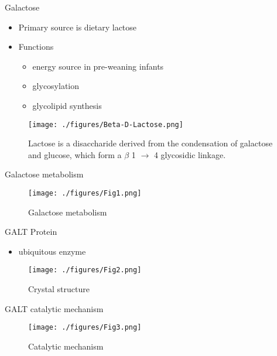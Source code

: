 \documentclass[presentation, smaller]{beamer}
\begin{document}
\begin{frame}[label={sec:orgheadline2}]{Galactose}
\begin{itemize}
\item Primary source is dietary lactose
\item Functions
\begin{itemize}
\item energy source in pre-weaning infants
\item glycosylation
\item glycolipid synthesis
\end{itemize}
\end{itemize}


\begin{figure}[htb]
\centering
\texttt{[image: ./figures/Beta-D-Lactose.png]}
\caption[lactose]{\label{fig:lactose}
Lactose is a disaccharide derived from the condensation of galactose and glucose, which form a \(\beta\) 1 \(\to\) 4 glycosidic linkage.}
\end{figure}
\end{frame}


\begin{frame}[label={sec:orgheadline3}]{Galactose metabolism}
\begin{figure}[htb]
\centering
\texttt{[image: ./figures/Fig1.png]}
\caption[met]{\label{fig:met}
Galactose metabolism}
\end{figure}
\end{frame}


\begin{frame}[label={sec:orgheadline4}]{GALT Protein}
\begin{itemize}
\item ubiquitous enzyme
\end{itemize}

\begin{figure}[htb]
\centering
\texttt{[image: ./figures/Fig2.png]}
\caption[structure]{\label{fig:struct}
Crystal structure}
\end{figure}
\end{frame}


\begin{frame}[label={sec:orgheadline5}]{GALT catalytic mechanism}
\begin{figure}[htb]
\centering
\texttt{[image: ./figures/Fig3.png]}
\caption[mechanism]{\label{fig:mech}
Catalytic mechanism}
\end{figure}
\end{frame}
\end{document}
